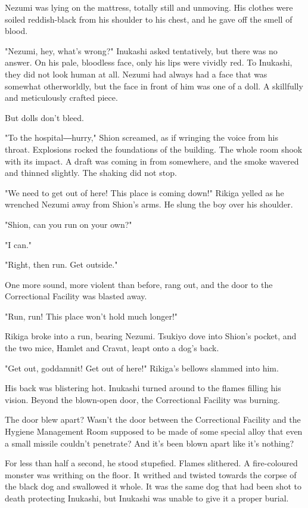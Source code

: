 Nezumi was lying on the mattress, totally still and unmoving. His
clothes were soiled reddish-black from his shoulder to his chest, and he
gave off the smell of blood.

"Nezumi, hey, what's wrong?" Inukashi asked tentatively, but there was
no answer. On his pale, bloodless face, only his lips were vividly red.
To Inukashi, they did not look human at all. Nezumi had always had a
face that was somewhat otherworldly, but the face in front of him was
one of a doll. A skillfully and meticulously crafted piece.

But dolls don't bleed.

"To the hospital―hurry," Shion screamed, as if wringing the voice from
his throat. Explosions rocked the foundations of the building. The whole
room shook with its impact. A draft was coming in from somewhere, and
the smoke wavered and thinned slightly. The shaking did not stop.

"We need to get out of here! This place is coming down!" Rikiga yelled
as he wrenched Nezumi away from Shion's arms. He slung the boy over his
shoulder.

"Shion, can you run on your own?"

"I can."

"Right, then run. Get outside."

One more sound, more violent than before, rang out, and the door to the
Correctional Facility was blasted away.

"Run, run! This place won't hold much longer!"

Rikiga broke into a run, bearing Nezumi. Tsukiyo dove into Shion's
pocket, and the two mice, Hamlet and Cravat, leapt onto a dog's back.

"Get out, goddamnit! Get out of here!" Rikiga's bellows slammed into
him.

His back was blistering hot. Inukashi turned around to the flames
filling his vision. Beyond the blown-open door, the Correctional
Facility was burning.

The door blew apart? Wasn't the door between the Correctional Facility
and the Hygiene Management Room supposed to be made of some special
alloy that even a small missile couldn't penetrate? And it's been blown
apart like it's nothing?

For less than half a second, he stood stupefied. Flames slithered. A
fire-coloured monster was writhing on the floor. It writhed and twisted
towards the corpse of the black dog and swallowed it whole. It was the
same dog that had been shot to death protecting Inukashi, but Inukashi
was unable to give it a proper burial.

